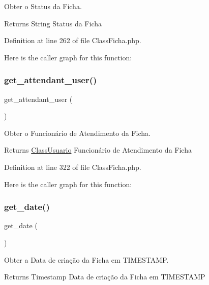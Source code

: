 Obter o Status da Ficha. 

\begin{DoxyReturn}{Returns}
String Status da Ficha 
\end{DoxyReturn}


Definition at line 262 of file Class\+Ficha.\+php.

Here is the caller graph for this function\+:
\mbox{\label{class_class_ficha_a29c1686664048f7cd94c207fde913589}} 
\subsubsection{\texorpdfstring{get\+\_\+attendant\+\_\+user()}{get\_attendant\_user()}}
{\footnotesize\ttfamily get\+\_\+attendant\+\_\+user (\begin{DoxyParamCaption}{ }\end{DoxyParamCaption})}



Obter o Funcionário de Atendimento da Ficha. 

\begin{DoxyReturn}{Returns}
\hyperlink{class_class_usuario}{Class\+Usuario} Funcionário de Atendimento da Ficha 
\end{DoxyReturn}


Definition at line 322 of file Class\+Ficha.\+php.

Here is the caller graph for this function\+:
\mbox{\label{class_class_ficha_a848589b82df6900da2764018f69cd8c4}} 
\subsubsection{\texorpdfstring{get\+\_\+date()}{get\_date()}}
{\footnotesize\ttfamily get\+\_\+date (\begin{DoxyParamCaption}{ }\end{DoxyParamCaption})}



Obter a Data de criação da Ficha em T\+I\+M\+E\+S\+T\+A\+MP. 

\begin{DoxyReturn}{Returns}
Timestamp Data de criação da Ficha em T\+I\+M\+E\+S\+T\+A\+MP 
\end{DoxyReturn}


